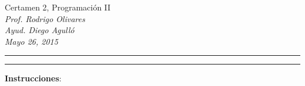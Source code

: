 \documentclass[10pt]{article}
\begin{document}
    \begin{center}
        {\Large Certamen 2, Programaci\'on II} \\
        \emph{\small Prof. Rodrigo Olivares} \\
        \emph{\small Ayud. Diego Agull\'o} \\
        \emph{\scriptsize Mayo 26, 2015} 
    \end{center}
    \vspace*{-35pt}
    \begin{center}
        \rule{1\textwidth}{.3pt}
    \end{center}
    \vspace*{-42pt}
    \begin{center}
        \rule{1\textwidth}{2pt}
    \end{center}

    \vspace*{-15pt}
    {\small \textbf{Instrucciones}:}
    \vspace*{-15pt}
\end{document}
